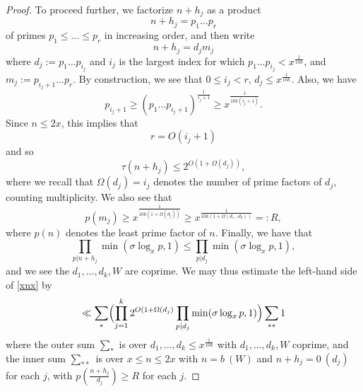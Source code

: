 \begin{proof}
To proceed further, we factorize $n+h_j$ as a product
$$ n+h_j = p_1 \dots p_r$$
of primes $p_1 \leq \dots \leq p_r$ in increasing order, and then write 
$$ n+h_j = d_j m_j$$
where $d_j := p_1 \dots p_{i_j}$ and $i_j$ is the largest index for which $p_1 \dots p_{i_j} < x^{\frac{1}{10k}}$, and $m_j := p_{i_j+1} \dots p_r$.  By construction, we see that $0 \leq i_j < r$, $d_j \leq x^{\frac{1}{10k}}$.  Also, we have
$$ p_{i_j+1} \geq (p_1 \dots p_{i_j+1})^{\frac{1}{i_j+1}} \geq x^{\frac{1}{10k(i_j+1)}}.$$
Since $n \leq 2x$, this implies that
$$ r = O( i_j + 1 )$$
and so
$$ \tau(n+h_j) \leq 2^{O(1+\Omega(d_j))},$$
where we recall that $\Omega(d_j) = i_j$ denotes the number of prime factors of $d_j$, counting multiplicity. We also see that
$$ p(m_j) \geq x^{\frac{1}{10k(1+\Omega(d_j))}}\geq x^{\frac{1}{10k(1+\Omega(d_1\dots d_k))}}=:R,$$
where $p(n)$ denotes the least prime factor of $n$. Finally, we have that
$$ \prod_{p|n+h_j} \min(\sigma \log_x p,1) \leq \prod_{p|d_j} \min( \sigma \log_x p, 1 ),$$
and we see the $d_1,\dots,d_k,W$ are coprime.  We may thus estimate the left-hand side of \eqref{xnx} by
$$ 
\ll \sum_* \Bigl(\prod_{j=1}^k 2^{O(1+\Omega(d_j)} \prod_{p|d_j} \min( \sigma \log_x p, 1 )\Bigr) \sum_{**} 1$$
where the outer sum $\sum_*$ is over $d_1,\dots,d_k \leq x^{\frac{1}{10k}}$ with $d_1,\dots,d_k,W$ coprime, and the inner sum $\sum_{**}$ is over $x \leq n \leq 2x$ with $n = b\ (W)$ and $n + h_j = 0\ (d_j)$ for each $j$, with $p( \frac{n+h_j}{d_j}) \geq R$ for each $j$.


\end{proof}
